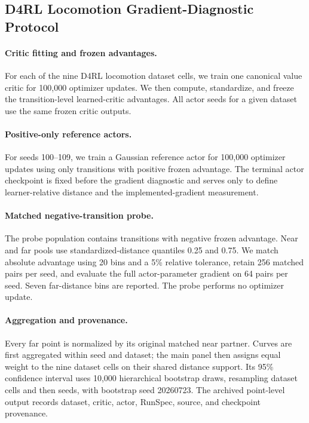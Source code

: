 \documentclass{article}
\theoremstyle{plain}
\theoremstyle{definition}
\theoremstyle{remark}
\begin{document}
\subsection{D4RL Locomotion Gradient-Diagnostic Protocol}
\label{app:d4rl_gradient_diagnostic}

\paragraph{Critic fitting and frozen advantages.}
For each of the nine D4RL locomotion dataset cells, we train one canonical
value critic for 100,000 optimizer updates. We then compute, standardize, and
freeze the transition-level learned-critic advantages. All actor seeds for a
given dataset use the same frozen critic outputs.

\paragraph{Positive-only reference actors.}
For seeds 100--109, we train a Gaussian reference actor for 100,000 optimizer
updates using only transitions with positive frozen advantage. The terminal
actor checkpoint is fixed before the gradient diagnostic and serves only to
define learner-relative distance and the implemented-gradient measurement.

\paragraph{Matched negative-transition probe.}
The probe population contains transitions with negative frozen advantage.
Near and far pools use standardized-distance quantiles 0.25 and 0.75. We match
absolute advantage using 20 bins and a 5\% relative tolerance, retain 256
matched pairs per seed, and evaluate the full actor-parameter gradient on 64
pairs per seed. Seven far-distance bins are reported. The probe performs no
optimizer update.

\paragraph{Aggregation and provenance.}
Every far point is normalized by its original matched near partner. Curves are
first aggregated within seed and dataset; the main panel then assigns equal
weight to the nine dataset cells on their shared distance support. Its 95\%
confidence interval uses 10,000 hierarchical bootstrap draws, resampling
dataset cells and then seeds, with bootstrap seed 20260723. The archived
point-level output records dataset, critic, actor, RunSpec, source, and
checkpoint provenance.
\end{document}
